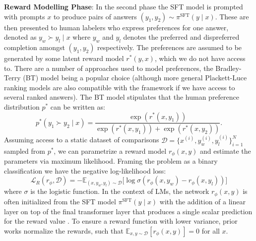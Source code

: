\documentclass{article}
\newcommand{\pisft}{\pi^\text{SFT}}
\begin{document}
\textbf{Reward Modelling Phase}: In the second phase the SFT model is prompted with prompts $x$ to produce pairs of answers $(y_1, y_2)\sim \pisft(y \mid x)$. These are then presented to human labelers who express preferences for one answer, denoted as $y_w\succ y_l \mid x$ where $y_w$ and $y_l$ denotes the preferred and dispreferred completion amongst $(y_1, y_2)$ respectively. The preferences are assumed to be generated by some latent reward model $r^*(y, x)$, which we do not have access to. There are a number of approaches used to model preferences, the Bradley-Terry (BT) \cite{bradley1952rankanalysis} model being a popular choice (although more general Plackett-Luce ranking models \citep{plackett1975analysis, luce2012individual} are also compatible with the framework if we have access to several ranked answers). The BT model stipulates that the human preference distribution $p^*$ can be written as:
\begin{equation}\label{eq:bradley-terry}
    p^*(y_1\succ y_2 \mid x)=\frac{\exp\left(r^*(x, y_1)\right)}{\exp\left(r^*(x, y_1)\right) + \exp\left(r^*(x, y_2)\right)}.
\end{equation}
Assuming access to a static dataset of comparisons $\mathcal{D}=\bigl\{x^{(i)}, y_w^{(i)}, y_l^{(i)}\bigr\}_{i=1}^N$ sampled from $p^*$, we can parametrize a reward model $r_{\phi}(x, y)$ and estimate the parameters via maximum likelihood. Framing the problem as a binary classification we have the negative log-likelihood loss:
\begin{equation}\label{eq:reward_model}
    \mathcal{L}_R(r_{\phi}, \mathcal{D}) = -\mathbb{E}_{(x, y_w, y_l)\sim \mathcal{D}}\bigl[\log \sigma(r_{\phi}(x, y_w)- r_{\phi}(x, y_l))\bigr]
\end{equation}
where $\sigma$ is the logistic function. In the context of LMs, the network $r_{\phi}(x, y)$ is often initialized from the SFT model $\pisft(y \mid x)$ with the addition of a linear layer on top of the final transformer layer that produces a single scalar prediction for the reward value \cite{ziegler2020finetuning}. To ensure a reward function with lower variance, prior works normalize the rewards, such that  $\mathbb{E}_{x,y\sim \mathcal{D}}\left[r_\phi(x, y)\right] = 0$ for all $x$.
\end{document}
